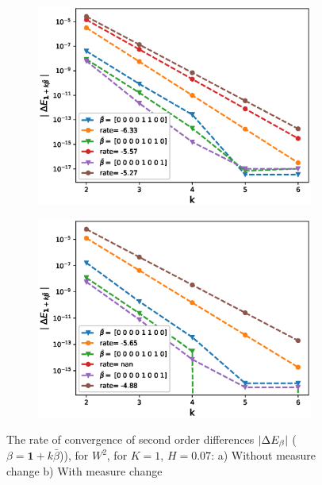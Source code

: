 \documentclass[11pt]{article}
\begin{document}
\begin{figure}[!h]
	\centering
	\begin{subfigure}{.4\textwidth}
		\centering
		\includegraphics[width=1\linewidth]{./figures/rBergomi_mixed_error_rates/without_change_measure/N_4/H_007/mixed_difference_order2_rbergomi_4steps_H_007_K_1_totally_hierarch_with_rate_W2}
		\caption{}
		\label{fig:sub3}
	\end{subfigure}%
	\begin{subfigure}{.4\textwidth}
		\centering
		\includegraphics[width=1\linewidth]{./figures/rBergomi_mixed_error_rates/partial_change_measure/N_4/H_007/mixed_difference_order2_rbergomi_4steps_H_007_K_1_totally_hierarch_with_rate_W2_change_measure_part_spec}
		\caption{}
		\label{fig:sub4}
	\end{subfigure}
	
	\caption{The rate of convergence of  second order differences $\left\lvert\Delta E_{\beta}\right\rvert$ ($\beta=\mathbf{1}+k \bar{\beta}$)), for $W^2$, for $K=1$, $H=0.07$: a) Without measure change b) With measure change}
	\label{fig:second_diff_comp_K_1_H_007_W_2}
\end{figure}
\end{document}
